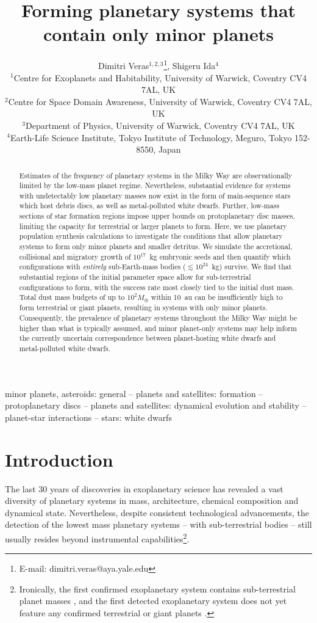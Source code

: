 \documentclass[useAMS,usenatbib]{mn2e}
\title[Forming only minor planets]
{Forming planetary systems that contain only minor planets}
\author[]{Dimitri Veras$^{1,2,3}$\thanks{E-mail: dimitri.veras@aya.yale.edu},
Shigeru Ida$^{4}$
%
\\
$^{1}$Centre for Exoplanets and Habitability, University of Warwick, Coventry CV4 7AL, UK
\\
$^{2}$Centre for Space Domain Awareness, University of Warwick, Coventry CV4 7AL, UK
\\
$^{3}$Department of Physics, University of Warwick, Coventry CV4 7AL, UK
\\
$^{4}$Earth-Life Science Institute, Tokyo Institute of Technology, Meguro, Tokyo 152-8550, Japan
}
\begin{document}
\label{firstpage}
\pagerange{\pageref{firstpage}--\pageref{lastpage}}
\maketitle


\begin{abstract}
Estimates of the frequency of planetary systems in the Milky Way are observationally limited by the low-mass planet regime. Nevertheless, substantial evidence for systems with undetectably low planetary masses now exist in the form of main-sequence stars which host debris discs, as well as metal-polluted white dwarfs. Further, low-mass sections of star formation regions impose upper bounds on protoplanetary disc masses, limiting the capacity for terrestrial or larger planets to form. Here, we use planetary population synthesis calculations to investigate the conditions that allow planetary systems to form only minor planets and smaller detritus. We simulate the accretional, collisional and migratory growth of $10^{17}$~kg embryonic seeds and then quantify which configurations with {\it entirely} sub-Earth-mass bodies ($\lesssim 10^{24}$~kg) survive. We find that substantial regions of the initial parameter space allow for sub-terrestrial configurations to form, with the success rate most closely tied to the initial dust mass. Total dust mass budgets of up to $10^2 M_{\oplus}$ within 10~au can be insufficiently high to form terrestrial or giant planets, resulting in systems with only minor planets. Consequently, the prevalence of planetary systems throughout the Milky Way might be higher than what is typically assumed, and minor planet-only systems may help inform the currently uncertain correspondence between planet-hosting white dwarfs and metal-polluted white dwarfs.
\end{abstract}


\begin{keywords}
minor planets, asteroids: general --
planets and satellites: formation --
protoplanetary discs --
planets and satellites: dynamical evolution and stability --
planet-star interactions --
stars: white dwarfs
\end{keywords}



\section{Introduction}

The last 30 years of discoveries in exoplanetary science has revealed a vast diversity of planetary systems in mass, architecture, chemical composition and dynamical state.  Nevertheless, despite consistent technological advancements, the detection of the lowest mass planetary systems -- with sub-terrestrial bodies -- still usually resides beyond instrumental capabilities\footnote{Ironically, the first confirmed exoplanetary system contains sub-terrestrial planet masses \citep{wolfra1992,wolszczan1994}, and the first detected exoplanetary system does not yet feature any confirmed terrestrial or giant planets \citep{vanmaanen1917}.}.
\end{document}
